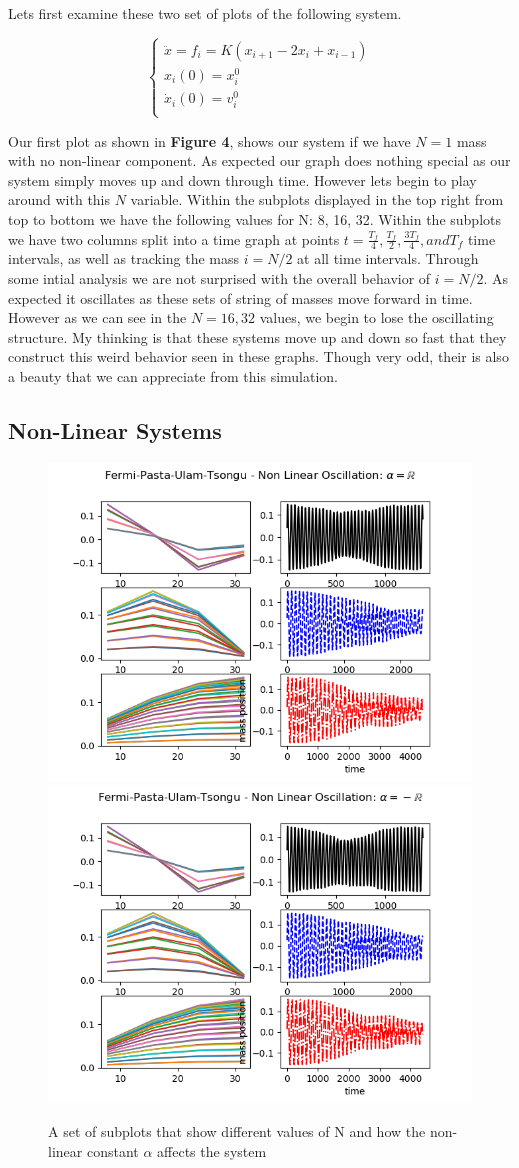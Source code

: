 Lets first examine these two set of plots of the following system. 

\begin{equation}
\label{FPUT system of ODE's}
\begin{cases}
\ddot{x} = f_{i} = K(x_{i+1}-2x_{i}+x_{i-1})\\
x_{i}(0) = x_{i}^{0}\\
\dot{x}_{i}(0) = v_{i}^{0}\\
\end{cases}
\end{equation}

Our first plot as shown in \textbf{Figure 4}, shows our system if we have $N = 1$ mass with no non-linear component. As expected our graph does nothing special as our system simply moves up and down through time. However lets begin to play around with this $N$ variable. Within the subplots displayed in the top right from top to bottom we have the following values for N: 8, 16, 32. Within the subplots we have two columns split into a time graph at points $t=\frac{T_{f}}{4},\frac{T_{f}}{2}, \frac{3T_{f}}{4}, and T_{f}$ time intervals, as well as tracking the mass $i = N/2$ at all time intervals. Through some intial analysis we are not surprised with the overall behavior of $i = N/2$. As expected it oscillates as these sets of string of masses move forward in time. However as we can see in the $N=16, 32$ values, we begin to lose the oscillating structure. My thinking is that these systems move up and down so fast that they construct this weird behavior seen in these graphs. Though very odd, their is also a beauty that we can appreciate from this simulation.  

\subsection{Non-Linear Systems}

\begin{figure}[h]
\includegraphics[width=.5\textwidth]{figures/FPUT2.png}
\includegraphics[width=.5\textwidth]{figures/FPUT3.png}
\caption{A set of subplots that show different values of N and how the non-linear constant $\alpha$ affects the system}
\end{figure}


